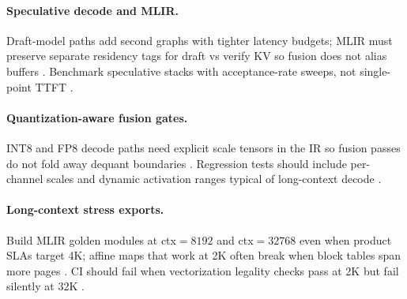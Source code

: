 \paragraph{Speculative decode and MLIR.} Draft-model paths add second graphs with tighter latency budgets; MLIR must preserve separate residency tags for draft vs verify KV so fusion does not alias buffers \citep{patel2025llminference,kwon2023vllm,yirage2026,chen2020compilerbasedhardw,memoryfloor2026,taxbreak2026,liu2024deepseekv3,amd2024aie,amd2024xdna,dao2022flashattention,dao2023flashdecoding,nvidia2024cudagraphs,nvidia2022hopper,semianalysis2024tma,dlbook}. Benchmark speculative stacks with acceptance-rate sweeps, not single-point TTFT \citep{patel2025llminference,yirage2026,memoryfloor2026,taxbreak2026,chen2020compilerbasedhardw,kwon2023vllm,liu2024deepseekv3,amd2024aie,amd2024xdna,dao2022flashattention,dao2023flashdecoding,nvidia2024cudagraphs,nvidia2022hopper,semianalysis2024tma,dlbook}.


\paragraph{Quantization-aware fusion gates.} INT8 and FP8 decode paths need explicit scale tensors in the IR so fusion passes do not fold away dequant boundaries \citep{liu2024deepseekv3,yirage2026,chen2020compilerbasedhardw,patel2025llminference,memoryfloor2026,taxbreak2026,kwon2023vllm,amd2024aie,amd2024xdna,dao2022flashattention,dao2023flashdecoding,nvidia2024cudagraphs,nvidia2022hopper,semianalysis2024tma,dlbook}. Regression tests should include per-channel scales and dynamic activation ranges typical of long-context decode \citep{liu2024deepseekv3,yirage2026,memoryfloor2026,taxbreak2026,chen2020compilerbasedhardw,patel2025llminference,kwon2023vllm,amd2024aie,amd2024xdna,dao2022flashattention,dao2023flashdecoding,nvidia2024cudagraphs,nvidia2022hopper,semianalysis2024tma,dlbook}.

\paragraph{Long-context stress exports.} Build MLIR golden modules at ctx${=}8192$ and ctx${=}32768$ even when product SLAs target 4K; affine maps that work at 2K often break when block tables span more pages \citep{kwon2023vllm,dao2022flashattention,yirage2026,chen2020compilerbasedhardw,memoryfloor2026,taxbreak2026,patel2025llminference,liu2024deepseekv3,amd2024aie,amd2024xdna,dao2023flashdecoding,nvidia2024cudagraphs,nvidia2022hopper,semianalysis2024tma,dlbook}. CI should fail when vectorization legality checks pass at 2K but fail silently at 32K \citep{yirage2026,kwon2023vllm,memoryfloor2026,taxbreak2026,chen2020compilerbasedhardw,patel2025llminference,liu2024deepseekv3,amd2024aie,amd2024xdna,dao2022flashattention,dao2023flashdecoding,nvidia2024cudagraphs,nvidia2022hopper,semianalysis2024tma,dlbook}.


